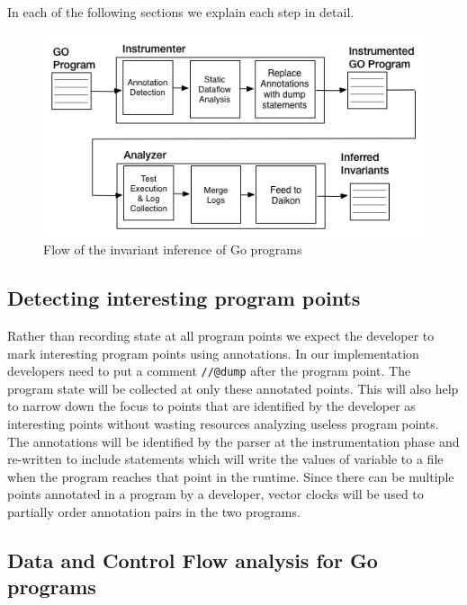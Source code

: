 In each of the following sections we explain each step in detail.
\begin{figure}
  \includegraphics[width=\columnwidth]{go_flow.png}
  \caption{Flow of the invariant inference of Go programs}
  \label{fig:go_flow}
\end{figure}



\subsection{Detecting interesting program points}

Rather than recording state at all program points we expect the
developer to mark interesting program points using annotations. In our implementation developers need to put a comment \texttt{//@dump} after the program point. The
program state will be collected at only these annotated points. This will
also help to narrow down the focus to points that are identified by
the developer as interesting points without wasting resources
analyzing useless program points. The annotations will be identified
by the parser at the instrumentation phase and re-written to include
statements which will write the values of variable to a file when the
program reaches that point in the runtime. Since there can be multiple points annotated in a program by a
developer, vector clocks will be used to partially order annotation
pairs in the two programs.%

\subsection{Data and Control Flow analysis for Go programs}

